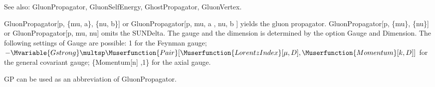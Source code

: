 See also: GluonPropagator, GluonSelfEnergy, GhostPropagator, GluonVertex.


















GluonPropagator[p, \{mu, a\}, \{nu, b\}] or GluonPropagator[p, mu, a , nu, b ] yields the gluon propagator. GluonPropagator[p, \{mu\},
  \{nu\}] or GluonPropagator[p, mu, nu] omits the SUNDelta. The gauge and the dimension is determined by the option Gauge and Dimension.
  The following settings of Gauge are possible: 1 for the Feynman gauge; \(-\Mvariable{Gstrong}\multsp \Muserfunction{Pair}[\Muserfunction{LorentzIndex}[\mu
,D],\Muserfunction{Momentum}[k,D]]\) for the general covariant gauge; \{Momentum[n] ,1\} for the axial gauge.

GP can be used as an abbreviation of GluonPropagator.


